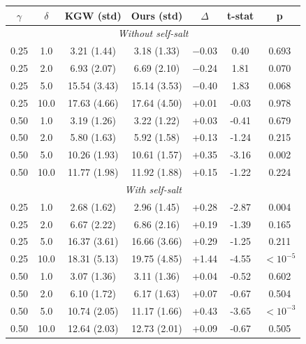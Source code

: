 \begin{tabular}{@{}ccccccc@{}}
\toprule
$\gamma$ & $\delta$ & KGW (std) & Ours (std) & $\Delta$ & t-stat & p \\
\midrule
\multicolumn{7}{c}{\textit{Without self-salt}} \\
\midrule
0.25 & 1.0 & 3.21 (1.44) & 3.18 (1.33) & $-$0.03 & 0.40 & 0.693 \\
0.25 & 2.0 & 6.93 (2.07) & 6.69 (2.10) & $-$0.24 & 1.81 & 0.070 \\
0.25 & 5.0 & 15.54 (3.43) & 15.14 (3.53) & $-$0.40 & 1.83 & 0.068 \\
0.25 & 10.0 & 17.63 (4.66) & 17.64 (4.50) & +0.01 & -0.03 & 0.978 \\
0.50 & 1.0 & 3.19 (1.26) & 3.22 (1.22) & +0.03 & -0.41 & 0.679 \\
0.50 & 2.0 & 5.80 (1.63) & 5.92 (1.58) & +0.13 & -1.24 & 0.215 \\
0.50 & 5.0 & 10.26 (1.93) & 10.61 (1.57) & +0.35 & -3.16 & 0.002 \\
0.50 & 10.0 & 11.77 (1.98) & 11.92 (1.88) & +0.15 & -1.22 & 0.224 \\
\midrule
\multicolumn{7}{c}{\textit{With self-salt}} \\
\midrule
0.25 & 1.0 & 2.68 (1.62) & 2.96 (1.45) & +0.28 & -2.87 & 0.004 \\
0.25 & 2.0 & 6.67 (2.22) & 6.86 (2.16) & +0.19 & -1.39 & 0.165 \\
0.25 & 5.0 & 16.37 (3.61) & 16.66 (3.66) & +0.29 & -1.25 & 0.211 \\
0.25 & 10.0 & 18.31 (5.13) & 19.75 (4.85) & +1.44 & -4.55 & $< 10^{-5}$ \\
0.50 & 1.0 & 3.07 (1.36) & 3.11 (1.36) & +0.04 & -0.52 & 0.602 \\
0.50 & 2.0 & 6.10 (1.72) & 6.17 (1.63) & +0.07 & -0.67 & 0.504 \\
0.50 & 5.0 & 10.74 (2.05) & 11.17 (1.66) & +0.43 & -3.65 & $< 10^{-3}$ \\
0.50 & 10.0 & 12.64 (2.03) & 12.73 (2.01) & +0.09 & -0.67 & 0.505 \\
\bottomrule
\end{tabular}
